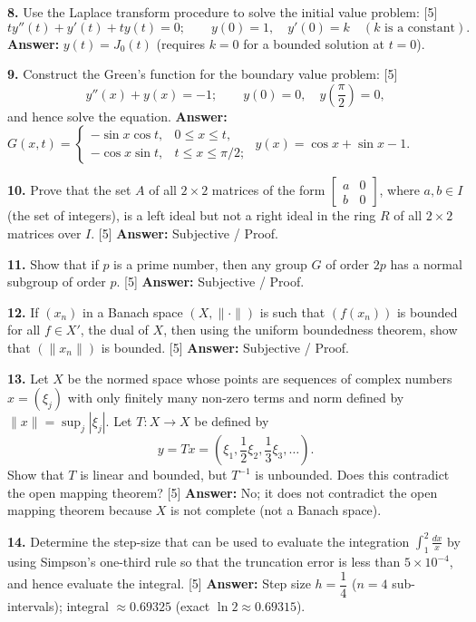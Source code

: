 \documentclass[11pt,a4paper]{article}
\newcommand{\ans}[1]{\textbf{Answer:} #1\par\medskip}
\begin{document}
\textbf{8.} Use the Laplace transform procedure to solve the initial value problem: \hfill [5]
\[
  t y''(t) + y'(t) + t y(t) = 0; \qquad y(0) = 1, \quad y'(0) = k \quad (k \text{ is a constant}).
\]
\ans{$y(t) = J_0(t)$ (requires $k = 0$ for a bounded solution at $t=0$).}

\textbf{9.} Construct the Green's function for the boundary value problem: \hfill [5]
\[
  y''(x) + y(x) = -1; \qquad y(0) = 0, \quad y\!\left(\frac{\pi}{2}\right) = 0,
\]
and hence solve the equation.
\ans{$G(x,t) = \begin{cases} -\sin x \cos t, & 0 \le x \le t, \\ -\cos x \sin t, & t \le x \le \pi/2; \end{cases}$ \quad $y(x) = \cos x + \sin x - 1$.}

\textbf{10.} Prove that the set $A$ of all $2 \times 2$ matrices of the form $\begin{bmatrix} a & 0 \\ b & 0 \end{bmatrix}$, where $a, b \in I$ (the set of integers), is a left ideal but not a right ideal in the ring $R$ of all $2 \times 2$ matrices over $I$. \hfill [5]
\ans{Subjective / Proof.}

\textbf{11.} Show that if $p$ is a prime number, then any group $G$ of order $2p$ has a normal subgroup of order $p$. \hfill [5]
\ans{Subjective / Proof.}

\textbf{12.} If $(x_n)$ in a Banach space $(X, \|\cdot\|)$ is such that $(f(x_n))$ is bounded for all $f \in X'$, the dual of $X$, then using the uniform boundedness theorem, show that $(\|x_n\|)$ is bounded. \hfill [5]
\ans{Subjective / Proof.}

\textbf{13.} Let $X$ be the normed space whose points are sequences of complex numbers $x = (\xi_j)$ with only finitely many non-zero terms and norm defined by $\|x\| = \sup_j |\xi_j|$. Let $T : X \to X$ be defined by
\[
  y = Tx = \left(\xi_1, \frac{1}{2}\xi_2, \frac{1}{3}\xi_3, \dots\right).
\]
Show that $T$ is linear and bounded, but $T^{-1}$ is unbounded. Does this contradict the open mapping theorem? \hfill [5]
\ans{No; it does not contradict the open mapping theorem because $X$ is not complete (not a Banach space).}

\textbf{14.} Determine the step-size that can be used to evaluate the integration $\displaystyle\int_1^2 \frac{dx}{x}$ by using Simpson's one-third rule so that the truncation error is less than $5 \times 10^{-4}$, and hence evaluate the integral. \hfill [5]
\ans{Step size $h = \dfrac{1}{4}$ ($n = 4$ sub-intervals); integral $\approx 0.69325$ (exact $\ln 2 \approx 0.69315$).}
\end{document}
